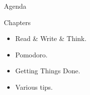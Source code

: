 
\begin{frame}{Agenda}
  \begin{block}{Chapters}
    \begin{itemize}
      \item Read \& Write \& Think.
      \item Pomodoro.
      \item Getting Things Done.
      \item Various tips.
    \end{itemize}
  \end{block}
\end{frame}


